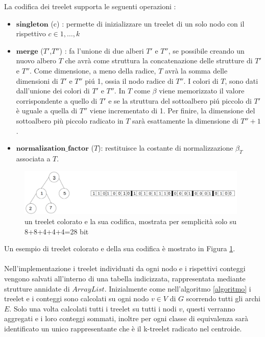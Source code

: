 La codifica dei treelet supporta le seguenti operazioni :
\begin{itemize}
	\item $ \textbf{singleton} $ (c) : permette di inizializzare un treelet di un solo nodo con il rispettivo $ c \in {1, \dots, k} $
	\item $ \textbf{merge} $ ($ T' $,$ T'' $) : fa l'unione di due alberi $ T' $ e $ T'' $, se possibile creando un nuovo albero $ T $ che avr\`a come struttura la concatenazione delle strutture di $ T' $ e $ T'' $.
	Come dimensione, a meno della radice, $ T $ avr\`a la somma delle dimensioni di $ T' $ e $ T'' $ pi\'u 1, ossia il nodo radice di $ T'' $.
	I colori di $ T $, sono dati dall'unione dei colori di $ T' $ e $ T'' $.
	In $ T $ come $ \beta $ viene memorizzato il valore corrispondente a quello di $ T' $ e se la struttura del sottoalbero pi\'u piccolo di $ T' $ \`e uguale a quella di $ T'' $ viene incrementato di 1. Per finire, la dimensione del sottoalbero pi\`u piccolo radicato in $ T $ sar\`a esattamente la dimensione di $ T''+1  $ .
	\item $\textbf{normalization\_factor}$ ($ T $): restituisce la costante di normalizzazione $ \beta_T $ associata a $ T $.
	    
\end{itemize}
\begin{figure}[htbp]
	\centering
	\includegraphics[width=11cm]{capitolo2/grafo4}
	\caption{un treelet colorato e la sua codifica, mostrata per semplicit\`a solo su 8+8+4+4+4=28 bit}
	\label{figura1}
\end{figure}
Un esempio di treelet colorato e della sua codifica \`e mostrato in Figura \ref{figura1}.\mbox{}\\\\
Nell'implementazione i treelet individuati da ogni nodo e i rispettivi conteggi vengono salvati all'interno di una tabella indicizzata, rappresentata mediante strutture annidate di $ ArrayList $.
Inizialmente come nell'algoritmo \ref{algoritmo} i treelet e i conteggi sono calcolati su ogni nodo $ v \in V $ di $ G $ scorrendo tutti gli archi $ E $.
Solo una volta calcolati  tutti i treelet su tutti i nodi $ v $, questi verranno aggregati e i loro conteggi sommati, inoltre per ogni classe di equivalenza sar\`a identificato un unico rappresentante che \`e il k-treelet radicato nel centroide.
